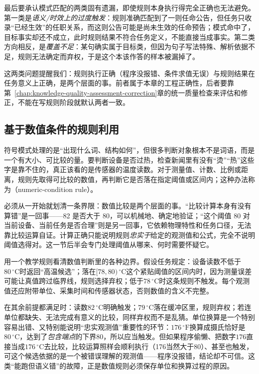 最后要承认模式匹配的两类固有遗漏，即使规则本身执行得完全正确也无法避免。第一类是\emph{语义/时效上的过度触发}：规则准确匹配到了一则任命公告，但任务只收录“已经生效”的任职关系，而这则公告可能是尚未生效的任命预告；模式命中了，目标事实却还不成立，此时规则结果不符合任务定义，不能直接当成事实。第二类方向相反，是\emph{覆盖不足}：某句确实属于目标类，但因为句子写法特殊、解析依据不足，规则无法确定而弃权，于是这个本该作答的样本被漏掉了。

这两类问题提醒我们：规则执行正确（程序没报错、条件求值无误）与规则结果在任务意义上正确，是两个层面的事。前者属于本章的工程正确性，后者要靠第~\ref{chap:knowledge-quality-assessment-correction}章的统一质量检查来评估和修正，不能在写规则阶段就默认两者一致。

\subsection{基于数值条件的规则利用}
\label{sec:rule-based-knowledge-acquisition-numeric-pattern}

符号模式处理的是“出现什么词、结构如何”，但很多判断对象根本不是词语，而是一个有大小、可比较的量。要判断设备是否过热，检查新闻里有没有“烫”“热”这些字是靠不住的，真正该看的是传感器的温度读数。对于测量值、计数、比例或距离，规则先取得可比较的数值，再判断它是否落在指定阈值或区间内；这种办法称为（numeric-condition rule）。

必须从一开始就划清一条界限：数值比较是两个层面的事。“比较计算本身有没有算错”是一回事——82 是否大于 80，可以机械地、确定地验证；“这个阈值 80 对当前设备、当前任务是否合理”则是另一回事，它依赖物理特性和任务口径，无法靠比较运算自证。计算正确只能说明规则\emph{忠实于}给定的观测值和公式，完全不说明阈值选得对。这一节后半会专门处理阈值从哪来、何时需要怀疑它。

用一个教学规则看清数值判断里的各种边界。假设任务规定：设备读数不低于$80\,^\circ\mathrm{C}$时返回“高温候选”；落在$[78,80)\,^\circ\mathrm{C}$这个紧贴阈值的区间内时，因为测量误差可能让真值跨过临界线，规则选择弃权；低于$78\,^\circ\mathrm{C}$时这条规则不触发。每个观测值还应附带单位、采集时间和传感器状态，否则数值的含义不完整。

在其余前提都满足时：读数$82\,^\circ\mathrm{C}$明确触发；$79\,^\circ\mathrm{C}$落在缓冲区里，规则弃权；若连单位都缺失、无法完成有意义的比较，同样弃权而不是乱猜。单位换算是一个特别容易出错、又特别能说明“忠实观测值”重要性的环节：$176\,^\circ\mathrm{F}$换算成摄氏恰好是$80\,^\circ\mathrm{C}$，达到了\emph{包含端点}的下界$80$，所以应当触发。但如果程序偷懒、把数字$176$直接当成$176\,^\circ\mathrm{C}$去比较，比较运算照样会顺利执行（176当然大于80）、甚至也触发，可这个候选依据的是一个被错误理解的观测值——程序没报错，结论却不可信。这类“能跑但语义错”的故障，正是数值规则必须保存单位和换算过程的原因。

